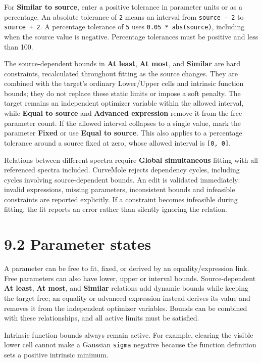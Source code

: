 \documentclass[
  10pt,
  a4paper,
  oneside]{scrreprt}
\begin{document}
For \textbf{Similar to source}, enter a positive tolerance in parameter
units or as a percentage. An absolute tolerance of \texttt{2} means an
interval from \texttt{source\ -\ 2} to \texttt{source\ +\ 2}. A
percentage tolerance of \texttt{5} uses \texttt{0.05\ *\ abs(source)},
including when the source value is negative. Percentage tolerances must
be positive and less than 100.

The source-dependent bounds in \textbf{At least}, \textbf{At most}, and
\textbf{Similar} are hard constraints, recalculated throughout fitting
as the source changes. They are combined with the target's ordinary
Lower/Upper cells and intrinsic function bounds; they do not replace
these static limits or impose a soft penalty. The target remains an
independent optimizer variable within the allowed interval, while
\textbf{Equal to source} and \textbf{Advanced expression} remove it from
the free parameter count. If the allowed interval collapses to a single
value, mark the parameter \textbf{Fixed} or use \textbf{Equal to
source}. This also applies to a percentage tolerance around a source
fixed at zero, whose allowed interval is \texttt{{[}0,\ 0{]}}.

Relations between different spectra require \textbf{Global simultaneous}
fitting with all referenced spectra included. CurveMole rejects
dependency cycles, including cycles involving source-dependent bounds.
An edit is validated immediately: invalid expressions, missing
parameters, inconsistent bounds and infeasible constraints are reported
explicitly. If a constraint becomes infeasible during fitting, the fit
reports an error rather than silently ignoring the relation.

\hypertarget{parameter-states}{%
\section{9.2 Parameter states}\label{parameter-states}}

A parameter can be free to fit, fixed, or derived by an
equality/expression link. Free parameters can also have lower, upper or
interval bounds. Source-dependent \textbf{At least}, \textbf{At most},
and \textbf{Similar} relations add dynamic bounds while keeping the
target free; an equality or advanced expression instead derives its
value and removes it from the independent optimizer variables. Bounds
can be combined with these relationships, and all active limits must be
satisfied.

Intrinsic function bounds always remain active. For example, clearing
the visible lower cell cannot make a Gaussian \texttt{sigma} negative
because the function definition sets a positive intrinsic minimum.
\end{document}
